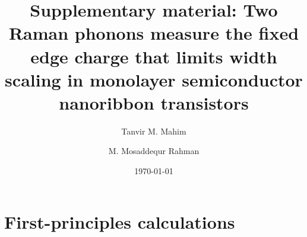 \documentclass[aip,apl,amsmath,amssymb,reprint,longbibliography]{revtex4-1}
\begin{document}
\title{Supplementary material: Two Raman phonons measure the fixed edge
charge that limits width scaling in monolayer semiconductor nanoribbon
transistors}

\author{Tanvir M. Mahim}
\author{M. Mosaddequr Rahman}

\date{\today}
\maketitle

\section{First-principles calculations}
\label{sec:dft}
\end{document}
